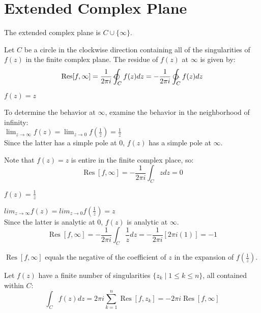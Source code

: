 \documentclass[letterpaper,12pt,fleqn]{article}
\DeclareMathOperator{\Res}{Res}
\begin{document}
\section*{Extended Complex Plane}

\begin{definition}
  The extended complex plane is $C\cup\{\infty\}$.
\end{definition}

\begin{definition}
  Let $C$ be a circle in the clockwise direction containing all of the
  singularities of $f(z)$ in the finite complex plane. The residue of $f(z)$
  at $\infty$ is given by:
  \[\Res[f,\infty]=\frac{1}{2\pi i}\ointclockwise_{C}f(z)dz=
  -\frac{1}{2\pi i}\ointctrclockwise_{C}f(z)dz\]
\end{definition}

\begin{example}
  $f(z)=z$

  To determine the behavior at $\infty$, examine the behavior in the
  neighborhood of infinity: \\
  $\lim_{z\to\infty}f(z)=\lim_{z\to 0}f(\frac{1}{z})=\frac{1}{z}$ \\
  Since the latter has a simple pole at $0$, $f(z)$ has a simple pole at
  $\infty$.

  Note that $f(z)=z$ is entire in the finite complex place, so:
  \[\Res[f,\infty]=-\frac{1}{2\pi i}\int_{C}zdz=0\]
\end{example}

\begin{example}
  $f(z)=\frac{1}{z}$

  $lim_{z\to\infty}f(z)=lim_{z\to0}f(\frac{1}{z})=z$ \\
  Since the latter is analytic at $0$, $f(z)$ is analytic at $\infty$.
  \[\Res[f,\infty]=-\frac{1}{2\pi i}\int_{C}\frac{1}{z}dz=
  -\frac{1}{2\pi i}[2\pi i(1)]=-1\]
\end{example}

\begin{theorem}
  $\Res[f,\infty]$ equals the negative of the coefficient of $z$ in the
  expansion of $f(\frac{1}{z})$.
\end{theorem}

\begin{theorem}
  Let $f(z)$ have a finite number of singularities $\{z_k\mid1\le k\le n\}$,
  all contained within $C$:
  \[\int_{C}f(z)dz=2\pi i\sum_{k=1}^n\Res[f,z_k]=-2\pi i\Res[f,\infty]\]
\end{theorem}
\end{document}
